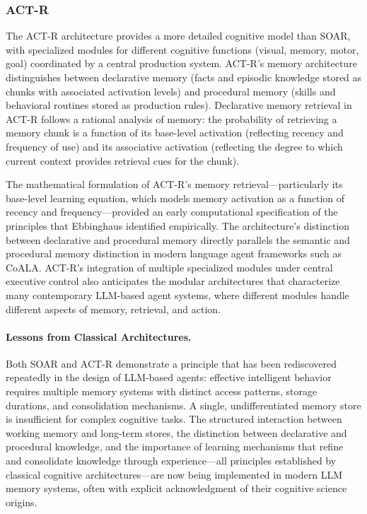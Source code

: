 \subsubsection{ACT-R}

The ACT-R architecture \citep{anderson2004integrated} provides a more detailed cognitive model than SOAR, with specialized modules for different cognitive functions (visual, memory, motor, goal) coordinated by a central production system. ACT-R's memory architecture distinguishes between declarative memory (facts and episodic knowledge stored as chunks with associated activation levels) and procedural memory (skills and behavioral routines stored as production rules). Declarative memory retrieval in ACT-R follows a rational analysis of memory: the probability of retrieving a memory chunk is a function of its base-level activation (reflecting recency and frequency of use) and its associative activation (reflecting the degree to which current context provides retrieval cues for the chunk).

The mathematical formulation of ACT-R's memory retrieval---particularly its base-level learning equation, which models memory activation as a function of recency and frequency---provided an early computational specification of the principles that Ebbinghaus identified empirically. The architecture's distinction between declarative and procedural memory directly parallels the semantic and procedural memory distinction in modern language agent frameworks such as CoALA. ACT-R's integration of multiple specialized modules under central executive control also anticipates the modular architectures that characterize many contemporary LLM-based agent systems, where different modules handle different aspects of memory, retrieval, and action.

\paragraph{Lessons from Classical Architectures.} Both SOAR and ACT-R demonstrate a principle that has been rediscovered repeatedly in the design of LLM-based agents: effective intelligent behavior requires multiple memory systems with distinct access patterns, storage durations, and consolidation mechanisms. A single, undifferentiated memory store is insufficient for complex cognitive tasks. The structured interaction between working memory and long-term stores, the distinction between declarative and procedural knowledge, and the importance of learning mechanisms that refine and consolidate knowledge through experience---all principles established by classical cognitive architectures---are now being implemented in modern LLM memory systems, often with explicit acknowledgment of their cognitive science origins.


